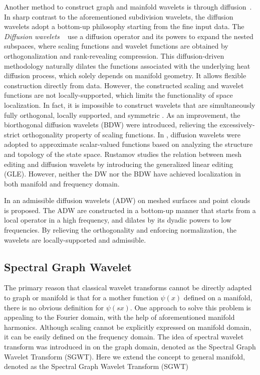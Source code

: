 Another method to construct graph and mainfold wavelets is
through diffusion~\cite{Coifman2006, Hou2013}.
In sharp contrast to the aforementioned subdivision wavelets, the diffusion 
wavelets adopt a bottom-up philosophy starting from the fine input data. 
The \emph{Diffusion wavelets} ~\cite{Coifman2006} use a diffusion operator 
and its powers to expand the nested subspaces, where scaling functions and
wavelet functions are obtained by orthogonalization and rank-revealing
compression. This diffusion-driven methodology naturally dilates the
functions associated with the underlying heat diffusion process, which solely
depends on manifold geometry. It allows flexible construction directly from data. 
However, the constructed scaling and wavelet functions are not locally-supported, 
which limits the functionality of space localization. In fact, it is impossible 
to construct wavelets that are simultaneously fully orthogonal, locally supported, 
and symmetric \cite{Lounsbery:1997:TOG}. As an improvement, the biorthogonal 
diffusion wavelets (BDW) \cite{Maggioni:2005:SPIE} were introduced, relieving the 
excessively-strict orthogonality property of scaling functions. 
In \cite{Mahadevan2005}, diffusion wavelets were adopted to approximate 
scalar-valued functions based on analyzing the structure and topology of the 
state space. Rustamov \cite{Rustamov:2009:ICMS} studies the relation between 
mesh editing and diffusion wavelets by introducing the generalized linear 
editing (GLE). However, neither the DW nor the BDW have achieved localization
in both manifold and frequency domain.

In \cite{Hou:2012:TVCG} an admissible diffusion wavelets (ADW) on meshed surfaces and point clouds is proposed.
The ADW are constructed in a bottom-up manner that starts from a local operator in a high frequency,
and dilates by its dyadic powers to low frequencies. By relieving the orthogonality and enforcing normalization,
the wavelets are locally-supported and admissible.

\subsection{Spectral Graph Wavelet}
The primary reason that classical wavelet transforms cannot be directly adapted to graph or manifold is 
that for a mother function $\psi(x)$ defined on a manifold,
there is no obvious definition for $\psi(sx)$. One approach to solve this problem is appealing to the Fourier domain,
with the help of aforementioned manifold harmonics. Although scaling cannot be explicitly expressed on manifold domain,
it can be easily defined on the frequency domain. The idea of spectral wavelet transform was introduced in \cite{Hammond2011}
on the graph domain, denoted as the Spectral Graph Wavelet Transform (SGWT). Here we extend the concept to general manifold,
denoted as the Spectral Graph Wavelet Transform (SGWT)

